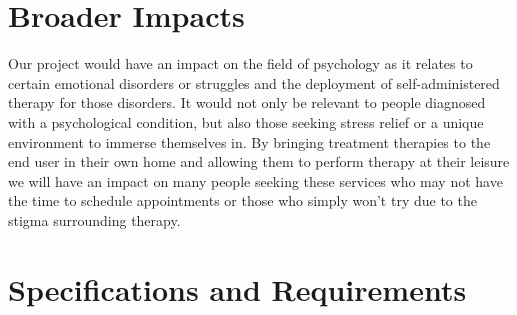 \documentclass[a4paper,10pt]{article}
\begin{document}
	\section{Broader Impacts}
	
	
	Our project would have an impact on the field of psychology as it relates to certain emotional disorders or struggles and the deployment of self-administered therapy for those disorders. It would not only be relevant to people diagnosed with a psychological condition, but also those seeking stress relief or a unique environment to immerse themselves in. By bringing treatment therapies to the end user in their own home and allowing them to perform therapy at their leisure we will have an impact on many people seeking these services who may not have the time to schedule appointments or those who simply won't try due to the stigma surrounding therapy.
	
	
	
	\pagebreak
\section{Specifications and Requirements}
\end{document}
